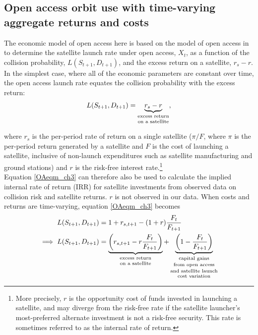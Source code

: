 \documentclass[12pt]{article}
\begin{document}
\subsection{Open access orbit use with time-varying aggregate returns and costs}

The economic model of open access here is based on the model of open access in \citet{raorondinaWP} to determine the satellite launch rate under open access, $X_t$, as a function of the collision probability, $L(S_{t+1},D_{t+1})$, and the excess return on a satellite, $r_{s} - r$. In the simplest case, where all of the economic parameters are constant over time, the open access launch rate equates the collision probability with the excess return:
\begin{equation}
\label{OAeqm_ch3}
L(S_{t+1},D_{t+1}) = \underbrace{r_s - r}_{\text{\shortstack{excess return\\on a satellite}}},
\end{equation}

where $r_s$ is the per-period rate of return on a single satellite ($\pi/F$, where $\pi$ is the per-period return generated by a satellite and $F$ is the cost of launching a satellite, inclusive of non-launch expenditures such as satellite manufacturing and ground stations) and $r$ is the risk-free interest rate.\footnote{More precisely, $r$ is the opportunity cost of funds invested in launching a satellite, and may diverge from the risk-free rate if the satellite launcher's most-preferred alternate investment is not a risk-free security. This rate is sometimes referred to as the internal rate of return.} \\

Equation \ref{OAeqm_ch3} can therefore also be used to calculate the implied internal rate of return (IRR) for satellite investments from observed data on collision risk and satellite returns. $r$ is not observed in our data. When costs and returns are time-varying, equation \ref{OAeqm_ch3} becomes
\begin{align}
\label{OAeqm_ch3_2}
L(S_{t+1},D_{t+1}) &= 1+ r_{s,t+1} - (1+r) \frac{F_t}{F_{t+1}} \\
\implies L(S_{t+1},D_{t+1}) &= \underbrace{\left( r_{s,t+1} - r \frac{F_t}{F_{t+1}} \right)}_{\text{\shortstack{excess return\\on a satellite}}} + \underbrace{\left(1 - \frac{F_t}{F_{t+1}} \right)}_{\text{\shortstack{capital gains\\from open access\\and satellite launch\\cost variation}}} \nonumber
\end{align}
\end{document}

